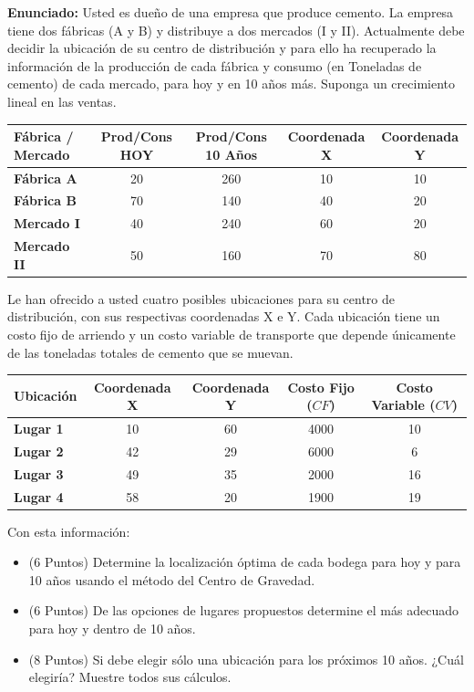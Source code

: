 \documentclass[11pt, a4paper]{article}
\begin{document}
  \textbf{Enunciado:}
  Usted es dueño de una empresa que produce cemento. La empresa tiene dos fábricas (A y B) y distribuye a dos mercados (I y II). Actualmente debe decidir la ubicación de su centro de distribución y para ello ha recuperado la información de la producción de cada fábrica y consumo (en Toneladas de cemento) de cada mercado, para hoy y en 10 años más. Suponga un crecimiento lineal en las ventas.

  \begin{center}
  \small
  \begin{tabular}{lcccc}
    \toprule
    \textbf{Fábrica / Mercado} & \textbf{Prod/Cons HOY} & \textbf{Prod/Cons 10 Años} & \textbf{Coordenada X} & \textbf{Coordenada Y} \\
    \midrule
    \textbf{Fábrica A} & 20 & 260 & 10 & 10 \\
    \textbf{Fábrica B} & 70 & 140 & 40 & 20 \\
    \textbf{Mercado I} & 40 & 240 & 60 & 20 \\
    \textbf{Mercado II} & 50 & 160 & 70 & 80 \\
    \bottomrule
  \end{tabular}
  \end{center}

  Le han ofrecido a usted cuatro posibles ubicaciones para su centro de distribución, con sus respectivas coordenadas X e Y. Cada ubicación tiene un costo fijo de arriendo y un costo variable de transporte que depende únicamente de las toneladas totales de cemento que se muevan.

  \begin{center}
  \small
  \begin{tabular}{lcccc}
    \toprule
    \textbf{Ubicación} & \textbf{Coordenada X} & \textbf{Coordenada Y} & \textbf{Costo Fijo ($CF$)} & \textbf{Costo Variable ($CV$)} \\
    \midrule
    \textbf{Lugar 1} & 10 & 60 & 4000 & 10 \\
    \textbf{Lugar 2} & 42 & 29 & 6000 & 6 \\
    \textbf{Lugar 3} & 49 & 35 & 2000 & 16 \\
    \textbf{Lugar 4} & 58 & 20 & 1900 & 19 \\
    \bottomrule
  \end{tabular}
  \end{center}

  Con esta información:
  \begin{itemize}
    \item[\textbf{a)}] (6 Puntos) Determine la localización óptima de cada bodega para hoy y para 10 años usando el método del Centro de Gravedad.
    \item[\textbf{b)}] (6 Puntos) De las opciones de lugares propuestos determine el más adecuado para hoy y dentro de 10 años.
    \item[\textbf{c)}] (8 Puntos) Si debe elegir sólo una ubicación para los próximos 10 años. ¿Cuál elegiría? Muestre todos sus cálculos.
  \end{itemize}
\end{document}
